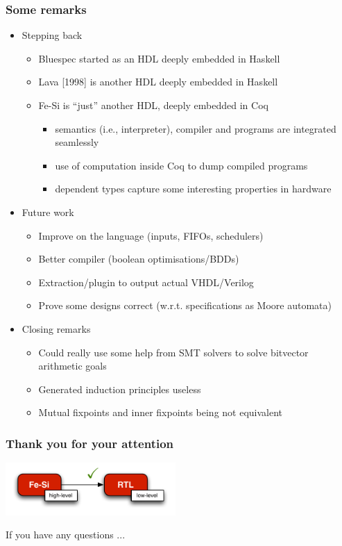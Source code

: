 \documentclass[9pt]{beamer}
\newcommand\fesi{Fe-Si}
\begin{document}
\begin{frame}[fragile]
  \frametitle{Some remarks}
  \begin{itemize}

  \item Stepping back
    \begin{itemize}
    \item Bluespec started as an HDL deeply embedded in Haskell
    \item Lava [1998] is another HDL deeply embedded in Haskell
    \item \fesi{} is ``just'' another HDL,  deeply embedded in \alert{Coq}
      \pause
      \begin{itemize}
      \item semantics (i.e., interpreter), compiler and programs are \alert{integrated seamlessly}
      \item use of computation \alert{inside} Coq to dump compiled programs
      \item dependent types capture some interesting properties in hardware
      \end{itemize}
    \end{itemize}

\pause

  \item Future work
      \begin{itemize}
      \item Improve on the language (inputs, FIFOs, schedulers)
      \item Better compiler (boolean optimisations/BDDs)
      \item Extraction/plugin to output actual VHDL/Verilog
      \item Prove some designs correct (w.r.t. specifications as Moore automata)
      \end{itemize}
      
\pause

    \item Closing remarks
      \begin{itemize}
      \item Could really use some help from SMT solvers to solve bitvector arithmetic goals
      \item Generated induction principles useless
      \item Mutual fixpoints and inner fixpoints being not equivalent
      \end{itemize}
  
    \end{itemize}
\end{frame}

\begin{frame}
  \frametitle{Thank you for your attention}
  
  \begin{center}
    \includegraphics[height= 2cm ]{figs/compilation.pdf}

    \vspace{1cm}

    If you have any questions ... \\
  \end{center}
  
\end{frame}
\end{document}
